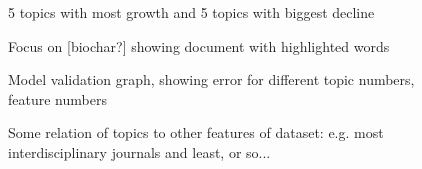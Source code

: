 \documentclass{article}
\begin{document}
\begin{figure}
    \caption{5 topics with most growth and 5 topics with biggest decline}
\end{figure}

\begin{figure}
    \caption{Focus on [biochar?] showing document with highlighted words}
\end{figure}

\begin{figure}
    \caption{Model validation graph, showing error for different topic numbers, feature numbers}
\end{figure}


\begin{figure}
    \caption{Some relation of topics to other features of dataset: e.g. most interdisciplinary journals and least, or so...}
\end{figure}



\listoffigures



\end{document}

